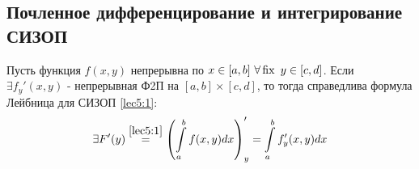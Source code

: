 \documentclass[../../main.tex]{subfiles}
\begin{document}
\subsection{Почленное дифференцирование и интегрирование СИЗОП}

\begin{thm}
	Пусть функция $ f(x, y) $ непрерывна по $ x \in [a, b]\ 
	\forall \fix\ y \in [c, d] $. Если $ \exists f_y'(x, y) $ -
	непрерывная Ф2П на $ [a, b] \times [c, d] $, то тогда справедлива формула
	Лейбница для СИЗОП \eqref{lec5:1}:
	\begin{equation}
		\label{lec6:8}
		\exists F'(y) \stackrel{\eqref{lec5:1}}{=} \left(
		\int\limits_a^b f(x, y) dx
		\right)_y' = \int\limits_a^b f_y'(x, y)dx
	\end{equation}
\end{thm}
\end{document}
